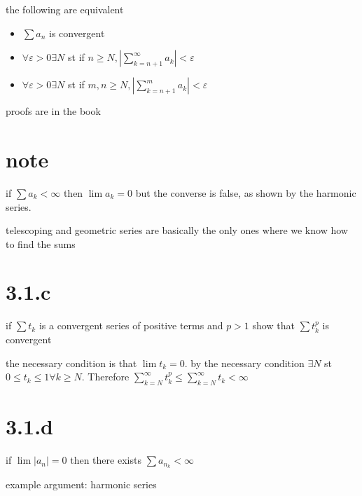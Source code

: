 \documentclass[letterpaper]{article}
\begin{document}
the following are equivalent
\begin{itemize}
\item
$\sum a_n$ is convergent
\item
$\forall\varepsilon>0\exists N$ st if $n\ge N, \left\lvert\sum\limits_{k=n+1}^\infty{a_k}\right\rvert<\varepsilon$
\item
$\forall\varepsilon>0\exists N$ st if $m,n\ge N, \left\lvert\sum\limits_{k=n+1}^m{a_k}\right\rvert<\varepsilon$
\end{itemize}
proofs are in the book

\section*{note}
if $\sum a_k<\infty$ then $\lim a_k=0$ but the converse is false, as shown by the harmonic series.

telescoping and geometric series are basically the only ones where we know how to find the sums

\section*{3.1.c}
if $\sum t_k$ is a convergent series of positive terms and $p>1$ show that $\sum t_k^p$ is convergent

the necessary condition is that $\lim t_k=0$. by the necessary condition $\exists N$ st $0\le t_k\le1\forall k\ge N$. Therefore $\sum\limits_{k=N}^\infty{t_k^p}\le\sum\limits_{k=N}^\infty{t_k}<\infty$ 
\section*{3.1.d}
if $\lim |a_n|=0$ then there exists $\sum a_{n_k}<\infty$

example argument: harmonic series
\end{document}
